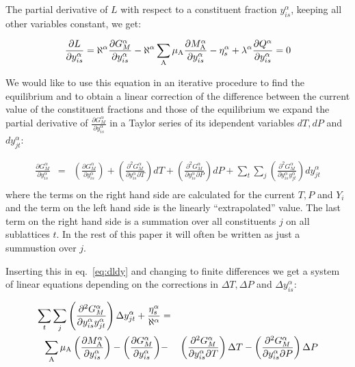 \documentclass[12pt]{article}
\begin{document}
The partial derivative of $L$ with respect to a constituent fraction
$y^{\alpha}_{is}$, keeping all other variables constant, we get:

\begin{equation}
\frac{\partial L}{\partial y^{\alpha}_{is}} =
\aleph^{\alpha}\frac{\partial G_M^{\alpha}}{\partial y^{\alpha}_{is}}
- \aleph^{\alpha}\sum_{\rm A} \mu_{\rm A}
\frac{\partial M^{\alpha}_{\rm A}}{\partial y^{\alpha}_{is}}-
\eta^{\alpha}_s+
\lambda^{\alpha}\frac{\partial Q^{\alpha}}{\partial y^{\alpha}_{is}}
 = 0\label{eq:dldy}
\end{equation}

We would like to use this equation in an iterative procedure to find
the equilibrium and to obtain a linear correction of the difference
between the current value of the constituent fractions and those of
the equilibrium we expand the partial derivative of $\frac{\partial
G_M^{\alpha}}{\partial y^{\alpha}_{is}}$ in a Taylor series of its
idependent variables $dT, dP$ and $dy_{jt}^{\alpha}$:

\begin{eqnarray}
\frac{\partial G_M^{\alpha}}{\partial y^{\alpha}_{is}} &=&
\left(\frac{\partial G^{\alpha}_M}{\partial y^{\alpha}_{is}}\right)
+\left(\frac{\partial^2 G_M^{\alpha}}{\partial y^{\alpha}_{is}\partial T}\right) dT
+\left(\frac{\partial^2 G_M^{\alpha}}{\partial y^{\alpha}_{is}\partial P}\right) dP
+\sum_t\sum_{j}\left(\frac{\partial^2  G^{\alpha}_M}
{\partial y^{\alpha}_{is} y^{\alpha}_{jt}}\right)dy^{\alpha}_{jt}
\nonumber\\\label{eq:taylor3}
\end{eqnarray}
where the terms on the right hand side are calculated for the current $T,
P$ and $Y_i$ and the term on the left hand side is the linearly
``extrapolated'' value.  The last term on the right hand side is a
summation over all constituents $j$ on all sublattices $t$.  In the
rest of this paper it will often be written as just a summustion over
$j$.

Inserting this in eq.~\ref{eq:dldy} and changing to finite differences
we get a system of linear equations depending on the corrections in
$\Delta T, \Delta P$ and $\Delta y^{\alpha}_{is}$:

\begin{eqnarray}
\sum_t \sum_{j}\left(\frac{\partial^2  G^{\alpha}_M}
{\partial y^{\alpha}_{is} y^{\alpha}_{jt}}\right)\Delta y^{\alpha}_{jt}
+\frac{\eta^{\alpha}_s}{\aleph^{\alpha}} &=&\nonumber\\
\sum_{\rm A} \mu_{\rm A} \left(\frac{\partial M^{\alpha}_{\rm A}}
{\partial y^{\alpha}_{is}}\right) -
\left(\frac{\partial G^{\alpha}_M}{\partial y^{\alpha}_{is}}\right) &-&
\left(\frac{\partial^2 G_M^{\alpha}}{\partial y^{\alpha}_{is}\partial T}\right)\Delta T
-\left(\frac{\partial^2 G_M^{\alpha}}{\partial y^{\alpha}_{is}\partial P}\right)\Delta P
\nonumber\\&&\label{eq:phasemat2}
\end{eqnarray}
\end{document}
